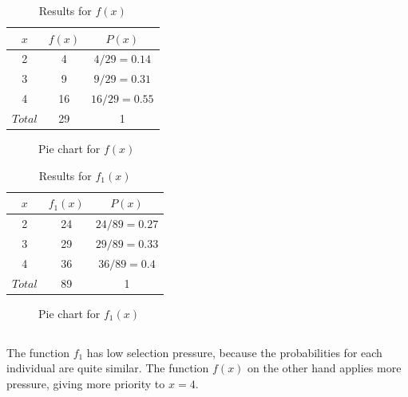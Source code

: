 \documentclass{scrartcl}
\begin{document}
\begin{table}[h!]
\centering
\begin{tabular}{| c | c | c |}
\hline
$x$ & $f(x)$ & $P(x)$ \\ 
\hline
2 & 4 & $4/29 = 0.14$ \\  
\hline
3 & 9 & $9/29 = 0.31$ \\  
\hline
4 & 16 & $16/29 = 0.55$ \\  
\hline
$Total$ & 29 & 1 \\
\hline
\end{tabular}
\caption{Results for $f(x)$}
\label{table:table2_1_1}
\end{table}

\begin{figure}[h!]
\centering

\caption{Pie chart for $f(x)$}
\label{fig:pie2_1_1}
\end{figure}

\begin{table}[h!]
\centering
\begin{tabular}{| c | c | c |}
 \hline
 $x$ & $f_1(x)$ & $P(x)$ \\ 
 \hline
 2 & 24 & $24/89 = 0.27$ \\  
 \hline
 3 & 29 & $29/89 = 0.33$ \\  
 \hline
 4 & 36 & $36/89 = 0.4$ \\  
 \hline
 $Total$ & 89 & 1 \\
\hline
\end{tabular}
\caption{Results for $f_1(x)$}
\label{table:table2_1_2}
\end{table}

\begin{figure}[h!]
    \centering
    \caption{Pie chart for $f_1(x)$}
    \label{fig:pie2_1_2}
\end{figure}

\subsection{}
The function $f_1$ has low selection pressure, because the probabilities for each individual are quite similar. The function $f(x)$ on the other hand applies more pressure, giving more priority to $x=4$.
\end{document}
